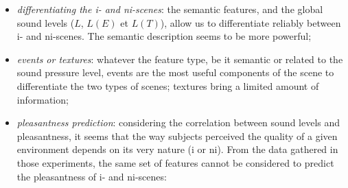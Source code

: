\documentclass[12pt]{elsarticle}
\begin{document}
\begin{itemize}


\item \emph{differentiating the i- and ni-scenes}: the semantic features, and the global sound levels ($L$, $L(E)$ et $L(T)$), allow us to differentiate reliably between i- and ni-scenes. The semantic description seems to be more powerful;
\item \emph{events or textures}: whatever the feature type, be it semantic or related to the sound pressure level, events are the most useful components of the scene to differentiate the two types of scenes; textures bring a limited amount of information;
\item \emph{pleasantness prediction}: considering the correlation between sound levels and pleasantness, it seems that the way subjects perceived the quality of a given environment depends on its very nature (i or ni). From the data gathered in those experiments, the same set of features cannot be considered to predict the pleasantness of i- and ni-scenes:

\begin{itemize}



\end{itemize}
\end{itemize}
\end{document}
